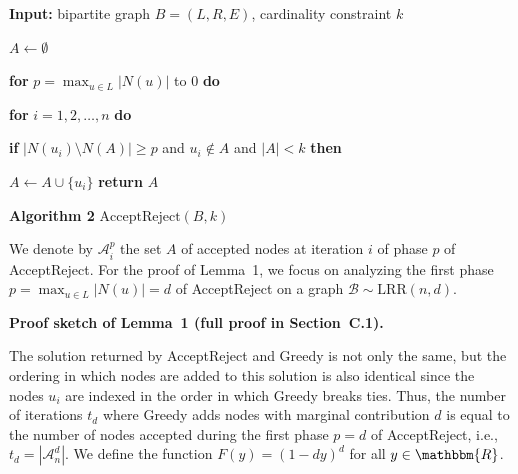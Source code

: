 \documentclass[10pt,a4paper]{article}
\begin{document}
                
                
              \textbf{Input:} bipartite graph $B=(L,R,E)$, cardinality constraint $k$



                
                
              $A\leftarrow\emptyset$



                
                
              \textbf{for} $p=\max_{u\in L}|N(u)|$ to $0$ \textbf{do}



                
                
              \quad \enspace \textbf{for} $i=1,2,\dots,n$ \textbf{do}



                
                
              \quad \quad \quad \textbf{if} $|N(u_{i})\setminus N(A)|\geq p$ and $u_{i}\notin A$ and $|A|<k$ \textbf{then}



                
                
              \quad \quad \quad \quad \enspace $A\leftarrow A\cup\{u_{i}\}$
\quad \quad \quad \quad \enspace \textbf{return} $A$



\textbf{Algorithm 2}  $\text{{AcceptReject}}(B,k)$



We denote by $\mathcal{A}^{p}_{i}$ the set $A$ of accepted nodes at iteration $i$ of phase $p$ of AcceptReject. For the proof of
Lemma 1, we focus on analyzing the first phase $p=\max_{u\in L}|N(u)|=d$ of AcceptReject on a graph $\mathcal{B}\sim\text{{LRR}}(n,d)$.\par




\par\medskip\noindent\textbf{Proof sketch of Lemma 1 (full proof in Section C.1).}\par



The solution returned by AcceptReject and Greedy is not only the same, but the ordering in which nodes are added to this solution is also identical since the nodes $u_{i}$ are indexed in the order in which Greedy breaks ties. Thus, the number of iterations $t_{d}$ where Greedy adds nodes with marginal contribution $d$ is equal to the number of nodes accepted during the first phase $p=d$ of AcceptReject, i.e., $t_{d}=|\mathcal{A}^{d}_{n}|$. We define the function $F(y)=\left(1-dy\right)^{d}$ for all $y\in\mathbbm{R}$.\par
\end{document}

